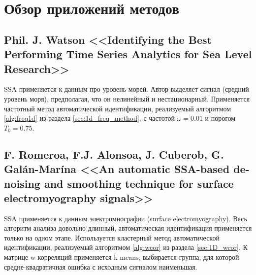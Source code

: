 \documentclass[specialist,
               substylefile = spbu.rtx,
               subf,href,colorlinks=true, 12pt]{disser}
\begin{document}



\section{Обзор приложений методов}

\subsection{Phil. J. Watson <<Identifying the Best Performing Time Series
Analytics for Sea Level Research>> \cite{Watson2016} \cite{Watson2016b}}

SSA применяется к данным  про уровень морей. Автор выделяет сигнал (средний уровень моря), предполагая, что он нелинейный и нестационарный. Применяется частотный метод автоматической идентификации, реализуемый алгоритмом \ref{alg:freq1d} из раздела \ref{sec:1d_freq_method}, с частотой $\omega=0.01$ и порогом $T_0 = 0.75$.

\subsection{F. Romeroa, F.J. Alonsoa, J. Cuberob, G. Galán-Marína <<An automatic SSA-based de-noising and smoothing technique for surface electromyography signals>>
 \cite{Romeroa2015}}

SSA применяется к данным электромиографии (surface electromyography). 
Весь алгоритм анализа довольно длинный, автоматическая идентификация применяется только на одном этапе.
Используется кластерный метод автоматической идентификации, реализуемый алгоритмом \ref{alg:wcor} из раздела \ref{sec:1D_wcor}. К матрице w-корреляций применяется k-means, выбирается группа, для которой средне-квадратичная ошибка с исходным сигналом наименьшая. 
\end{document}
